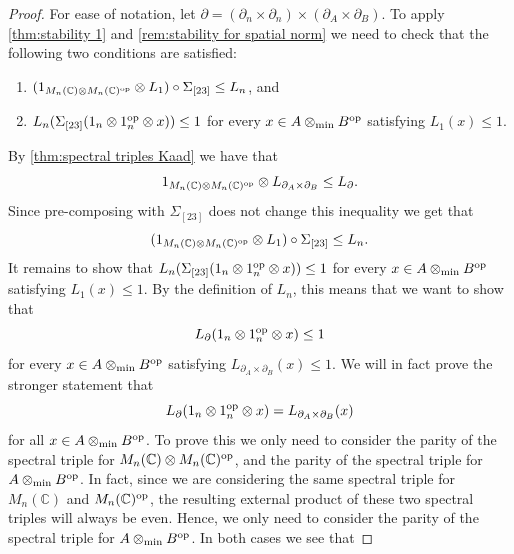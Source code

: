 \documentclass[11pt, a4paper, oneside, final, reqno]{amsart}
\newcommand{\bbC}{\mathbb{C}}
\theoremstyle{definition}
\theoremstyle{plain}
\theoremstyle{remark}
\numberwithin{equation}{section}
\begin{document}
\begin{proof}
    For ease of notation, let $\partial = (\partial_n \times \partial_n) \times (\partial_A \times \partial_B)$. To apply \cref{thm:stability 1} and \cref{rem:stability for spatial norm} we need to check that the following two conditions are satisfied:
    \begin{enumerate}
        \item $(1_{M_n(\bbC) \otimes M_n(\bbC)^{\rm op}} \otimes L_1) \circ \Sigma_{[23]} \leq L_n$, and
        \item $L_n(\Sigma_{[23]}(1_n \otimes 1_n^{\rm op} \otimes x)) \leq 1$ for every $x \in A \otimes_{\rm min} B^{\rm op}$ satisfying $L_1(x) \leq 1$.
    \end{enumerate}
    By \cref{thm:spectral triples Kaad} we have that
    \begin{equation*}
        1_{M_n(\bbC) \otimes M_n(\bbC)^{\rm op}} \otimes L_{\partial_A \times \partial_B} \leq L_{\partial}.
    \end{equation*}
    Since pre-composing with $\Sigma_{[23]}$ does not change this inequality we get that
    \begin{equation*}
        (1_{M_n(\bbC) \otimes M_n(\bbC)^{\rm op}} \otimes L_1) \circ \Sigma_{[23]} \leq L_n.
    \end{equation*}
    It remains to show that $L_n(\Sigma_{[23]}(1_n \otimes 1_n^{\rm op} \otimes x)) \leq 1$ for every $x \in A \otimes_{\rm min} B^{\rm op}$ satisfying $L_1(x) \leq 1$. By the definition of $L_n$, this means that we want to show that
    \begin{equation*}
        L_{\partial}(1_n \otimes 1_n^{\rm op} \otimes x) \leq 1
    \end{equation*}
    for every $x \in A \otimes_{\rm min} B^{\rm op}$ satisfying $L_{\partial_A \times \partial_B}(x) \leq 1$. We will in fact prove the stronger statement that
    \begin{equation}\label{eqn:seminorm from external products}
        L_{\partial}(1_n \otimes 1_n^{\rm op} \otimes x) = L_{\partial_A \times \partial_B}(x)
    \end{equation}
    for all $x \in A \otimes_{\rm min} B^{\rm op}$. To prove this we only need to consider the parity of the spectral triple for $M_n(\bbC) \otimes M_n(\bbC)^{\rm op}$, and the parity of the spectral triple for $A \otimes_{\rm min} B^{\rm op}$. In fact, since we are considering the same spectral triple for $M_n(\bbC)$ and $M_n(\bbC)^{\rm op}$, the resulting external product of these two spectral triples will always be even. Hence, we only need to consider the parity of the spectral triple for $A \otimes_{\rm min} B^{\rm op}$. In both cases we see that

\end{proof}
\end{document}

